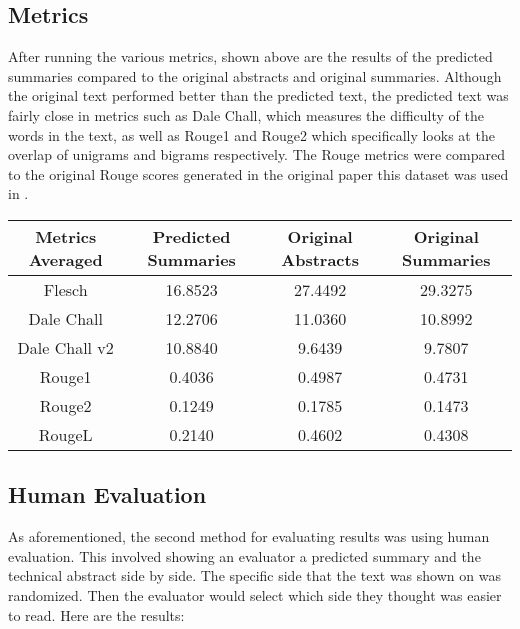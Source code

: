 \documentclass[11pt,a4paper]{article}
\begin{document}
\subsection{Metrics}

\indent \indent After running the various metrics, shown above are the results of the predicted summaries compared to the original abstracts and original summaries. Although the original text performed better than the predicted text, the predicted text was fairly close in metrics such as Dale Chall, which measures the difficulty of the words in the text, as well as Rouge1 and Rouge2 which specifically looks at the overlap of unigrams and bigrams respectively. The Rouge metrics were compared to the original Rouge scores generated in the original paper this dataset was used in \cite{luo2022readability}.

\begin{table}
  \begin{center}
    \begin{adjustbox}{width=0.49\textwidth}
      \begin{tabular}{|c | c | c | c|} 
      \hline
      Metrics Averaged & Predicted Summaries & Original Abstracts & Original Summaries \\ [1ex] 
      \hline\hline
      Flesch & 16.8523 & 27.4492 & 29.3275 \\ [1ex]
      \hline
      Dale Chall & 12.2706 & 11.0360 & 10.8992 \\ [1ex]
      \hline
      Dale Chall v2 & 10.8840 & 9.6439 & 9.7807 \\ [1ex]
      \hline
      Rouge1 & 0.4036 & 0.4987 & 0.4731 \\ [1ex]
      \hline
      Rouge2 & 0.1249 & 0.1785 & 0.1473 \\ [1ex] 
      \hline
      RougeL & 0.2140 & 0.4602 & 0.4308 \\ [1ex] 
      \hline
      \end{tabular}
  \end{adjustbox}
  \end{center}
\end{table}    


\subsection{Human Evaluation}

\indent \indent As aforementioned, the second method for evaluating results was using human evaluation. This involved showing an evaluator a predicted summary and the technical abstract side by side. The specific side that the text was shown on was randomized. Then the evaluator would select which side they thought was easier to read. Here are the results:
\end{document}
